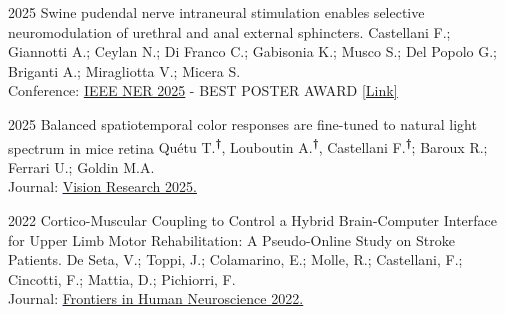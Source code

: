 \documentclass[9pt]{developercv} %
\begin{document}
\vspace{-15 pt}


\begin{entrylist}

        \entry
    {2025}
    {Swine pudendal nerve intraneural stimulation enables selective neuromodulation of urethral and anal external sphincters.}
    {}
    {Castellani F.; Giannotti A.; Ceylan N.; Di Franco C.; Gabisonia K.; Musco S.; Del Popolo G.; Briganti A.; Miragliotta V.; Micera S.\\
    Conference: 
    \textcolor{blue} {\underline{\href{https://filippocastellani.github.io/Portfolio/assets/documents/Abstracts/Swine_pudendal_nerve_intraneural_stimulation_enables_selective_neuromodulation_of_urethral_and_anal_external_sphincters.pdf}{IEEE NER 2025}}} - BEST POSTER AWARD  
    \textcolor{blue}{{\href{https://www.linkedin.com/feed/update/urn:li:activity:7395383873242816512/}{\underline{[Link]}}}}}
    
	    \entry
	{2025}
	{Balanced spatiotemporal color responses are fine-tuned to natural light spectrum in mice retina}
	{}
	{Quétu T.\textsuperscript{\textbf{†}}, Louboutin A.\textsuperscript{\textbf{†}}, Castellani F.\textsuperscript{\textbf{†}}; Baroux R.; Ferrari U.;  Goldin M.A. \\
	Journal: \textcolor{blue}{\underline{\href{https://doi.org/10.1016/j.visres.2025.108743}
			{Vision Research 2025.}}}}
            
    \entry
		{2022}
		{Cortico-Muscular Coupling to Control a Hybrid Brain-Computer Interface for Upper Limb Motor Rehabilitation: A Pseudo-Online Study on Stroke Patients.}
		{}
		{De Seta, V.; Toppi, J.; Colamarino, E.; Molle, R.; Castellani, F.; Cincotti, F.; Mattia, D.; Pichiorri, F. \\ 
        Journal: \textcolor{blue}{\underline{\href{https://doi.org/10.3389/fnhum.2022.1016862}
{Frontiers in Human Neuroscience 2022.}}}}
    
\end{entrylist}


\end{document}
